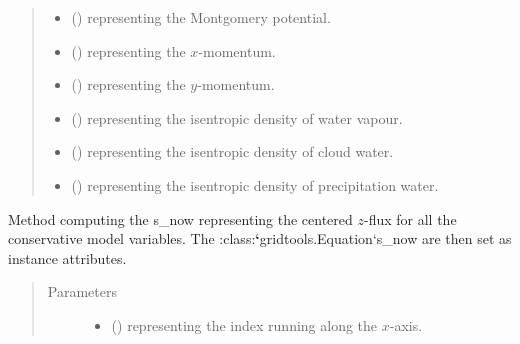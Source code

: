 \documentclass[letterpaper,10pt,english]{sphinxmanual}
\begin{document}
\begin{fulllineitems}
\begin{fulllineitems}
\begin{quote}
\begin{description}
\begin{itemize}
\item {} 
 () \textendash{}  representing the Montgomery potential.

\item {} 
 () \textendash{}  representing the \(x\)-momentum.

\item {} 
 () \textendash{}  representing the \(y\)-momentum.

\item {} 
 () \textendash{}  representing the isentropic density of water vapour.

\item {} 
 () \textendash{}  representing the isentropic density of cloud water.

\item {} 
 () \textendash{}  representing the isentropic density of precipitation water.

\end{itemize}

\end{description}\end{quote}

\end{fulllineitems}


\begin{fulllineitems}
\label{\detokenize{api:dycore.flux_isentropic_centered.FluxIsentropicCentered._compute_vertical_fluxes}}
Method computing the s\_now representing the centered \(z\)-flux for all the conservative
model variables. The :class:{\color{red}\bfseries{}{}`}gridtools.Equation{}`s\_now are then set as instance attributes.
\begin{quote}\begin{description}
\item[{Parameters}] \leavevmode\begin{itemize}
\item {} 
 () \textendash{}  representing the index running along the \(x\)-axis.


\end{itemize}
\end{description}
\end{quote}
\end{fulllineitems}
\end{fulllineitems}
\end{document}

